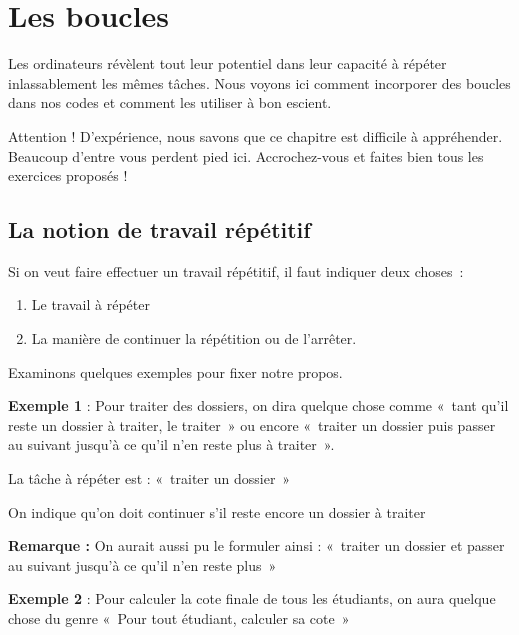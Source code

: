 \chapter{Les boucles}
\label{chap:bcl}

	Les ordinateurs révèlent tout leur potentiel dans leur capacité à
	répéter inlassablement les mêmes tâches. Nous voyons ici comment
	incorporer des boucles dans nos codes et comment les utiliser à bon
	escient.

	Attention ! D'expérience, nous savons que ce chapitre
	est difficile à appréhender. Beaucoup
	d'entre vous perdent pied ici. Accrochez-vous et
	faites bien tous les exercices proposés !


\section{La notion de travail répétitif}

	Si on veut faire effectuer un travail répétitif, 
	il faut indiquer deux choses~:
	
	\begin{enumerate}
	\item Le travail à répéter
	\item La manière de continuer la répétition 
		ou de l'arrêter.
	\end{enumerate}

	Examinons quelques exemples pour fixer notre propos.

	\textbf{Exemple 1} : Pour traiter des dossiers, on dira quelque chose
	comme «~tant qu'il reste un dossier à traiter, le
	traiter~» ou encore «~traiter un dossier puis passer au suivant
	jusqu'à ce qu'il
	n'en reste plus à traiter~».

	\begin{liste}
	\item La tâche à répéter est : «~traiter un dossier~»
	\item On indique qu'on doit continuer s'il
		reste encore un dossier à traiter
	\end{liste}

	\textbf{Remarque :} On aurait aussi pu le formuler ainsi : «~traiter un
	dossier et passer au suivant jusqu'à ce
	qu'il n'en reste plus~»

	\textbf{Exemple 2} : Pour calculer la cote finale de tous les étudiants,
	on aura quelque chose du genre «~Pour tout étudiant, calculer sa
	cote~»

